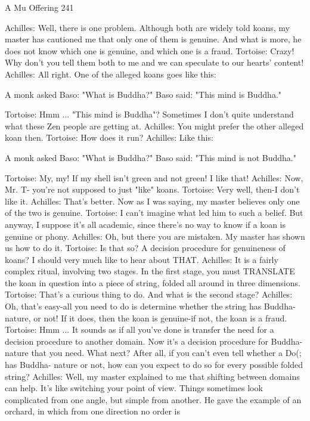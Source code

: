 A Mu Offering                                                                          241

Achilles: Well, there is one problem. Although both are widely told koans, my master has
   cautioned me that only one of them is genuine. And what is more, he does not know
   which one is genuine, and which one is a fraud.
Tortoise: Crazy! Why don't you tell them both to me and we can speculate to our hearts'
   content!
Achilles: All right. One of the alleged koans goes like this:

                        A monk asked Baso: "What is Buddha?"
                          Baso said: "This mind is Buddha."

Tortoise: Hmm ... "This mind is Buddha"? Sometimes I don't quite understand what these
   Zen people are getting at. Achilles: You might prefer the other alleged koan then.
Tortoise: How does it run? Achilles: Like this:

                        A monk asked Baso: "What is Buddha?"
                         Baso said: "This mind is not Buddha."

Tortoise: My, my! If my shell isn't green and not green! I like that! Achilles: Now, Mr. T-
   you're not supposed to just "like" koans.
Tortoise: Very well, then-I don't like it.
Achilles: That's better. Now as I was saying, my master believes only one of the two is
   genuine.
Tortoise: I can't imagine what led him to such a belief. But anyway, I suppose it's all
   academic, since there's no way to know if a koan is genuine or phony.
Achilles: Oh, but there you are mistaken. My master has shown us how to do it.
Tortoise: Is that so? A decision procedure for genuineness of koans? I should very much
   like to hear about THAT.
Achilles: It is a fairly complex ritual, involving two stages. In the first stage, you must
   TRANSLATE the koan in question into a piece of string, folded all around in three
   dimensions.
Tortoise: That's a curious thing to do. And what is the second stage?
Achilles: Oh, that's easy-all you need to do is determine whether the string has Buddha-
   nature, or not! If it does, then the koan is genuine-if not, the koan is a fraud.
Tortoise: Hmm ... It sounds as if all you've done is transfer the need for a decision
   procedure to another domain. Now it's a decision procedure for Buddha-nature that
   you need. What next? After all, if you can't even tell whether a Do(; has Buddha-
   nature or not, how can you expect to do so for every possible folded string?
Achilles: Well, my master explained to me that shifting between domains can help. It's
   like switching your point of view. Things sometimes look complicated from one
   angle, but simple from another. He gave the example of an orchard, in which from
   one direction no order is




